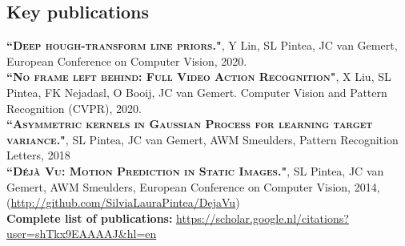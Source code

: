 \documentclass[a4paper, oneside, final]{scrartcl}
\begin{document}
\begin{center}
		\section{Key publications}
        \begin{flushleft}
			\textsc{\textbf{``Deep hough-transform line priors."}}, Y Lin, SL Pintea, JC van Gemert, European Conference on Computer Vision, 2020.\\[3px]
			\textsc{\textbf{``No frame left behind: Full Video Action Recognition"}}, X Liu, SL Pintea, FK Nejadasl, O Booij, JC van Gemert. 
            Computer Vision and Pattern Recognition (CVPR), 2020.\\[3px]
			\textsc{\textbf{``Asymmetric kernels in Gaussian Process for learning target variance."}}, SL Pintea, JC van Gemert, AWM Smeulders, 
            Pattern Recognition Letters, 2018\\[3px] 
            \textsc{\textbf{``D\'{e}j\`{a} Vu: Motion Prediction in Static Images."}}, SL Pintea, JC van Gemert, AWM Smeulders, 
            European Conference on Computer Vision, 2014, 
            (\small\href{http://github.com/SilviaLauraPintea/DejaVu}{http://github.com/SilviaLauraPintea/DejaVu})\\[10px]

            \textbf{Complete list of publications:} \href{https://scholar.google.nl/citations?user=shTkx9EAAAAJ&hl=en}{https://scholar.google.nl/citations?user=shTkx9EAAAAJ&hl=en}\\
        \end{flushleft}

\end{center}
\end{document}
